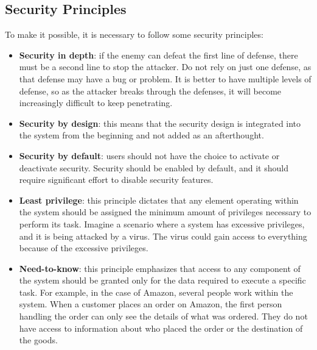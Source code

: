 \subsection*{Security Principles}
To make it possible, it is necessary to follow some security principles:
\begin{itemize}
  \item \textbf{Security in depth}: if the enemy can defeat the first line of defense, there must be a second line to stop the attacker. Do not rely on just one defense, as that defense may have a bug or problem. It is better to have multiple levels of defense, so as the attacker breaks through the defenses, it will become increasingly difficult to keep penetrating.

  \item \textbf{Security by design}: this means that the security design is integrated into the system from the beginning and not added as an afterthought.

  \item \textbf{Security by default}: users should not have the choice to activate or deactivate security. Security should be enabled by default, and it should require significant effort to disable security features.

  \item \textbf{Least privilege}: this principle dictates that any element operating within the system should be assigned the minimum amount of privileges necessary to perform its task. Imagine a scenario where a system has excessive privileges, and it is being attacked by a virus. The virus could gain access to everything because of the excessive privileges.

  \item \textbf{Need-to-know}: this principle emphasizes that access to any component of the system should be granted only for the data required to execute a specific task. For example, in the case of Amazon, several people work within the system. When a customer places an order on Amazon, the first person handling the order can only see the details of what was ordered. They do not have access to information about who placed the order or the destination of the goods.
\end{itemize}


